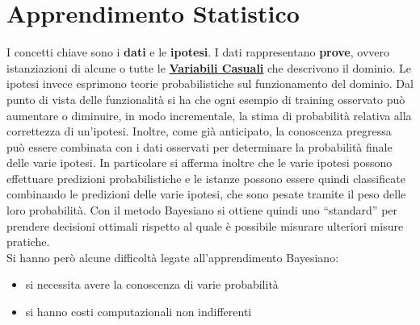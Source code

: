 \section{Apprendimento Statistico}
I concetti chiave sono i \textbf{dati} e le \textbf{ipotesi}. I dati rappresentano \textbf{prove}, ovvero istanziazioni di alcune o tutte le \textbf{\href{https://it.wikipedia.org/wiki/Variabile_casuale}{Variabili Casuali}} che descrivono il dominio. Le ipotesi invece esprimono  teorie probabilistiche sul funzionamento del dominio.
Dal punto di vista delle funzionalità si ha che ogni esempio di training osservato può aumentare o diminuire, in modo incrementale, la stima di probabilità relativa alla correttezza di un'ipotesi. Inoltre, come già anticipato, la conoscenza pregressa può essere combinata con i dati osservati per determinare la probabilità finale delle varie ipotesi. In particolare si afferma inoltre che le
varie ipotesi possono effettuare predizioni probabilistiche e le istanze possono essere quindi classificate combinando le predizioni delle varie ipotesi, che sono pesate tramite il peso delle loro probabilità. Con il metodo Bayesiano si ottiene quindi uno ``standard'' per prendere decisioni ottimali rispetto al quale è possibile misurare ulteriori misure pratiche.\\
Si hanno però alcune difficoltà legate all'apprendimento Bayesiano:
\begin{itemize}
  \item si necessita avere la conoscenza di varie probabilità
  \item si hanno costi computazionali non indifferenti
\end{itemize}
